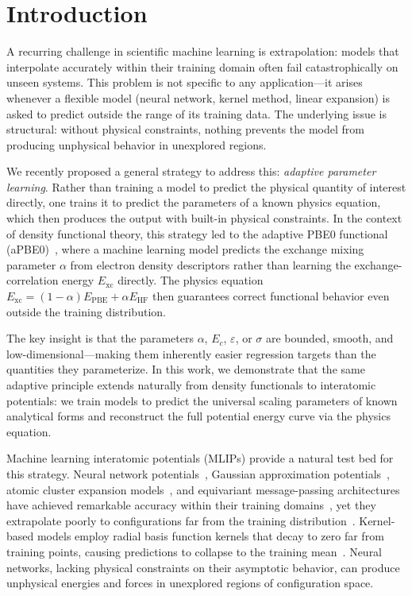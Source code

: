 \documentclass[aps,prb,twocolumn,superscriptaddress,longbibliography,floatfix]{revtex4-2}
\begin{document}
\section{Introduction}
\label{sec:intro}

A recurring challenge in scientific machine learning is extrapolation: models that interpolate accurately within their training domain often fail catastrophically on unseen systems. This problem is not specific to any application---it arises whenever a flexible model (neural network, kernel method, linear expansion) is asked to predict outside the range of its training data. The underlying issue is structural: without physical constraints, nothing prevents the model from producing unphysical behavior in unexplored regions.

We recently proposed a general strategy to address this: \emph{adaptive parameter learning}. Rather than training a model to predict the physical quantity of interest directly, one trains it to predict the parameters of a known physics equation, which then produces the output with built-in physical constraints. In the context of density functional theory, this strategy led to the adaptive PBE0 functional (aPBE0)~\cite{Khan2025}, where a machine learning model predicts the exchange mixing parameter $\alpha$ from electron density descriptors rather than learning the exchange-correlation energy $E_\mathrm{xc}$ directly. The physics equation $E_\mathrm{xc} = (1-\alpha)E_\mathrm{PBE} + \alpha E_\mathrm{HF}$ then guarantees correct functional behavior even outside the training distribution.

The key insight is that the parameters $\alpha$, $E_c$, $\varepsilon$, or $\sigma$ are bounded, smooth, and low-dimensional---making them inherently easier regression targets than the quantities they parameterize. In this work, we demonstrate that the same adaptive principle extends naturally from density functionals to interatomic potentials: we train models to predict the universal scaling parameters of known analytical forms and reconstruct the full potential energy curve via the physics equation.

Machine learning interatomic potentials (MLIPs) provide a natural test bed for this strategy. Neural network potentials~\cite{Behler2007,Smith2017}, Gaussian approximation potentials~\cite{Bartok2010,Deringer2019}, atomic cluster expansion models~\cite{Drautz2019}, and equivariant message-passing architectures~\cite{Batatia2022} have achieved remarkable accuracy within their training domains~\cite{Unke2021}, yet they extrapolate poorly to configurations far from the training distribution~\cite{Zuo2020,Noe2020}. Kernel-based models employ radial basis function kernels that decay to zero far from training points, causing predictions to collapse to the training mean~\cite{Bartok2010}. Neural networks, lacking physical constraints on their asymptotic behavior, can produce unphysical energies and forces in unexplored regions of configuration space.
\end{document}
